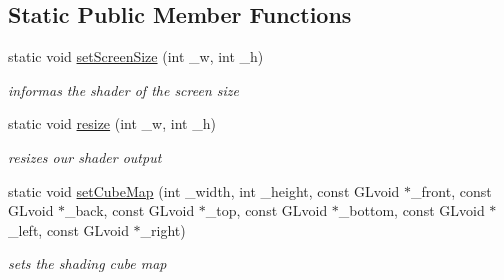 \subsection*{Static Public Member Functions}
\begin{DoxyCompactItemize}
\item 
static void \hyperlink{class_fluid_shader_a59302f1395ebd10872da9eb9d733d749}{set\-Screen\-Size} (int \-\_\-w, int \-\_\-h)
\begin{DoxyCompactList}\small\item\em informas the shader of the screen size \end{DoxyCompactList}\item 
static void \hyperlink{class_fluid_shader_a46a269869d9c2efa74a8e89d7a8e4960}{resize} (int \-\_\-w, int \-\_\-h)
\begin{DoxyCompactList}\small\item\em resizes our shader output \end{DoxyCompactList}\item 
static void \hyperlink{class_fluid_shader_a1e3a4859b77f0420d2ae201c3f09b5f4}{set\-Cube\-Map} (int \-\_\-width, int \-\_\-height, const G\-Lvoid $\ast$\-\_\-front, const G\-Lvoid $\ast$\-\_\-back, const G\-Lvoid $\ast$\-\_\-top, const G\-Lvoid $\ast$\-\_\-bottom, const G\-Lvoid $\ast$\-\_\-left, const G\-Lvoid $\ast$\-\_\-right)
\begin{DoxyCompactList}\small\item\em sets the shading cube map \end{DoxyCompactList}\end{DoxyCompactItemize}
